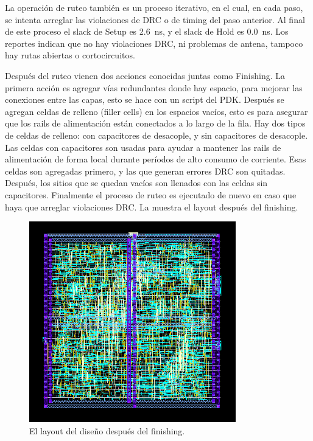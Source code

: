 \documentclass[a4paper, twoside, 11pt]{report}
\begin{document}
La operación de ruteo también es un proceso iterativo, en el cual, en cada paso, se intenta arreglar las violaciones de DRC o de timing del paso anterior. Al final de este proceso el slack de Setup es \SI{2.6}{\nano\second}, y el slack de Hold es \SI{0.0}{\nano\second}. Los reportes indican que no hay violaciones DRC, ni problemas de antena, tampoco hay rutas abiertas o cortocircuitos.

Después del ruteo vienen dos acciones conocidas juntas como Finishing. La primera acción es agregar vías redundantes donde hay espacio, para mejorar las conexiones entre las capas, esto se hace con un script del PDK. Después se agregan celdas de relleno (filler cells) en los espacios vacíos, esto es para asegurar que los rails de alimentación están conectados a lo largo de la fila. Hay dos tipos de celdas de relleno: con capacitores de desacople, y sin capacitores de desacople. Las celdas con capacitores son usadas para ayudar a mantener las rails de alimentación de forma local durante períodos de alto consumo de corriente. Esas celdas son agregadas primero, y las que generan errores DRC son quitadas. Después, los sitios que se quedan vacíos son llenados con las celdas sin capacitores. Finalmente el proceso de ruteo es ejecutado de nuevo en caso que haya que arreglar violaciones DRC. La  muestra el layout después del finishing.

\begin{figure}[htb]
  \centering
  \includegraphics[width=0.8\textwidth]{./img/pnr_out}
  \caption{El layout del diseño después del finishing.}
  \label{fig:pnr_out}
\end{figure}
\end{document}

